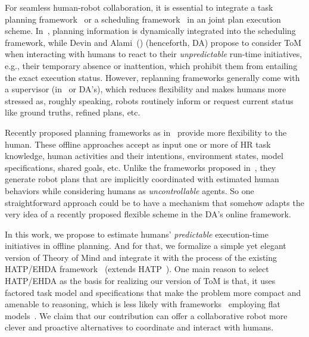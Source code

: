 \documentclass[letterpaper]{article} %
\begin{document}
For seamless human-robot collaboration, it is essential to integrate a task planning framework~\cite{lallement2018hatp} or a scheduling framework~\cite{ferreira2021scheduling} in an  joint plan execution scheme. 
In~\cite{PupaS21}, planning information is dynamically integrated into the scheduling framework, while Devin and Alami~(\citeyear{devin2016implemented}) (henceforth, DA) propose to consider ToM when interacting with humans to react to their 
\textit{unpredictable}
run-time initiatives,
e.g., their temporary absence or inattention, which prohibit them from entailing the exact execution status. 
However, replanning frameworks generally come with a supervisor (in~\cite{johannsmeier2016hierarchical} or DA's), which reduces flexibility and makes humans more stressed as, roughly speaking, robots routinely inform or request current status like ground truths, refined plans, etc.

Recently proposed planning frameworks as in~\cite{buisan:hal-03684211,UnhelkarLS19} provide more flexibility to the human. These offline approaches accept as input one or more of HR task knowledge, human activities and their intentions, environment states, model specifications, shared goals, etc. 
Unlike the frameworks proposed in~\cite{alami2006toward,lallement2018hatp,roncone2017transparent}, they generate robot plans that are implicitly coordinated with estimated human behaviors while considering humans as {\em uncontrollable} agents. 
So one straightforward approach could be to have a mechanism that somehow adapts the very idea of a recently proposed flexible scheme in the DA's online framework. 

In this work, we propose to estimate humans' \textit{predictable} execution-time initiatives in offline planning. And for that, we formalize a simple yet elegant version of Theory of Mind and integrate it with the process of the existing HATP/EHDA framework~\cite{buisan:hal-03684211} (extends  HATP~\cite{lallement2018hatp,CirilloKS09}). 
One main reason to select HATP/EHDA as the basis for realizing our version of ToM is that, it uses factored task model and specifications that make the problem more compact and amenable to   reasoning, which is less likely with frameworks~\cite{unhelkar2019learning} employing flat models~\cite{levine2014concurrent,unhelkar2019learning}.
We claim that our contribution can offer a collaborative robot more clever and proactive alternatives to coordinate and interact with humans.
\end{document}

